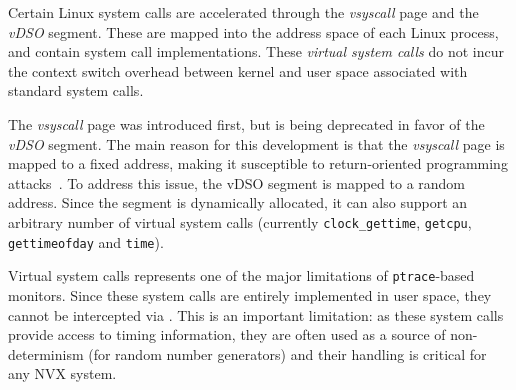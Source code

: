 Certain Linux system calls are accelerated through the \emph{vsyscall}
page and the \emph{vDSO} segment. These are mapped into the address
space of each Linux process, and contain system call
implementations. These \textit{virtual system calls} do not incur the
context switch overhead between kernel and user space associated with
standard system calls.

The \emph{vsyscall} page was introduced first, but is being deprecated
in favor of the \emph{vDSO} segment.
The main reason for this development is that the \emph{vsyscall} page
is mapped to a fixed address, making it susceptible to return-oriented
programming attacks~\cite{ROP:tissec12}. To address this issue, the
vDSO segment is mapped to a random address. Since the segment is
dynamically allocated, it can also support an arbitrary number of
virtual system calls (currently \lstinline`clock_gettime`, \lstinline`getcpu`,
\lstinline`gettimeofday` and \lstinline`time`).

Virtual system calls represents one of the major limitations of
\lstinline`ptrace`-based monitors. Since these system calls are entirely
implemented in user space, they cannot be intercepted via \ptrace.
This is an important limitation: as these system calls provide access
to timing information, they are often used as a source of
non-determinism (\eg for random number generators) and their handling
is critical for any NVX system. %

